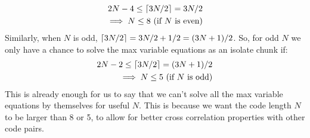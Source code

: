 \documentclass[a4paper]{article}
\DeclarePairedDelimiter{\ceil}{\lceil}{\rceil}
\begin{document}
\begin{align*}
2N-4 \leq \ceil{3N/2} = 3N/2\\
\implies N \leq 8 \text{ (if $N$ is even)}
\end{align*}
Similarly, when $N$ is odd, $\ceil{3N/2} = 3N/2+1/2 = (3N+1)/2$. So, for odd $N$ we only have a chance to solve the max variable equations as an isolate chunk if:
\begin{align*}
2N-2 \leq \ceil{3N/2} = (3N+1)/2\\
\implies N \leq 5 \text{ (if $N$ is odd)}
\end{align*}
This is already enough for us to say that we can't solve all the max variable equations by themselves for useful $N$. This is because we want the code length $N$ to be larger than 8 or 5, to allow for better cross correlation properties with other code pairs. 
\end{document}
